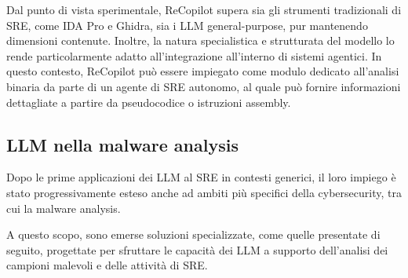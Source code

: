 \begin{description}
    Dal punto di vista sperimentale, ReCopilot supera sia gli strumenti tradizionali di SRE, come IDA Pro e Ghidra, sia i LLM general-purpose, pur mantenendo dimensioni contenute. Inoltre, la natura specialistica e strutturata del modello lo rende particolarmente adatto all'integrazione all'interno di sistemi agentici. In questo contesto, ReCopilot può essere impiegato come modulo dedicato all'analisi binaria da parte di un agente di SRE autonomo, al quale può fornire informazioni dettagliate a partire da pseudocodice o istruzioni assembly.

\end{description}

\subsection{LLM nella malware analysis}

Dopo le prime applicazioni dei LLM al SRE in contesti generici, il loro impiego è stato progressivamente esteso anche ad ambiti più specifici della cybersecurity, tra cui la malware analysis.

A questo scopo, sono emerse soluzioni specializzate, come quelle presentate di seguito, progettate per sfruttare le capacità dei LLM a supporto dell'analisi dei campioni malevoli e delle attività di SRE.

